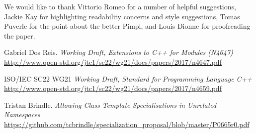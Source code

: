 \documentclass[reqno]{article}
\begin{document}
We would like to thank Vittorio Romeo for a number of helpful suggestions,
Jackie Kay for highlighting readability concerns and style suggestions, Tomas
Puverle for the point about the better Pimpl, and Louis Dionne for proofreading
the paper.



\begin{thebibliography}{9}

    Gabriel Dos Reis.
        \textit{Working Draft, Extensions to C++ for Modules (N4647)}
        \url{http://www.open-std.org/jtc1/sc22/wg21/docs/papers/2017/n4647.pdf}

    ISO/IEC SC22 WG21
        \textit{Working Draft, Standard for Programming Language C++}
        \url{http://www.open-std.org/jtc1/sc22/wg21/docs/papers/2017/n4659.pdf}

    Tristan Brindle.
        \textit{Allowing Class Template Specialisations in Unrelated Namespaces}
        \url{https://github.com/tcbrindle/specialization_proposal/blob/master/P0665r0.pdf}

\end{thebibliography}
\end{document}
